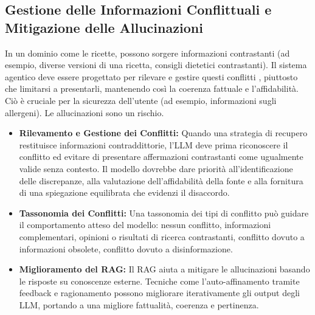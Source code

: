 \documentclass[a4paper, 11pt]{article}
\begin{document}
\subsection{Gestione delle Informazioni Conflittuali e Mitigazione delle Allucinazioni}
In un dominio come le ricette, possono sorgere informazioni contrastanti (ad esempio, diverse versioni di una ricetta, consigli dietetici contrastanti). Il sistema agentico deve essere progettato per rilevare e gestire questi conflitti \cite{dragged_into_conflicts}, piuttosto che limitarsi a presentarli, mantenendo così la coerenza fattuale e l'affidabilità. Ciò è cruciale per la sicurezza dell'utente (ad esempio, informazioni sugli allergeni). Le allucinazioni sono un rischio. \cite{mastering_rag_reranking}
\begin{itemize}
    \item \textbf{Rilevamento e Gestione dei Conflitti:} Quando una strategia di recupero restituisce informazioni contraddittorie, l'LLM deve prima riconoscere il conflitto ed evitare di presentare affermazioni contrastanti come ugualmente valide senza contesto. \cite{milvus_contradictory_info} Il modello dovrebbe dare priorità all'identificazione delle discrepanze, alla valutazione dell'affidabilità della fonte e alla fornitura di una spiegazione equilibrata che evidenzi il disaccordo. \cite{milvus_contradictory_info}
    \item \textbf{Tassonomia dei Conflitti:} Una tassonomia dei tipi di conflitto può guidare il comportamento atteso del modello: nessun conflitto, informazioni complementari, opinioni o risultati di ricerca contrastanti, conflitto dovuto a informazioni obsolete, conflitto dovuto a disinformazione. \cite{dragged_into_conflicts}
    \item \textbf{Miglioramento del RAG:} Il RAG aiuta a mitigare le allucinazioni basando le risposte su conoscenze esterne. \cite{beyond_traditional_finetuning} Tecniche come l'auto-affinamento tramite feedback e ragionamento possono migliorare iterativamente gli output degli LLM, portando a una migliore fattualità, coerenza e pertinenza. \cite{beyond_traditional_finetuning}
\end{itemize}
\end{document}
